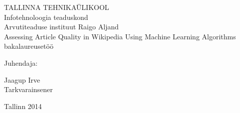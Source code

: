 \begin{titlepage}
\begin{center}
{\large TALLINNA TEHNIKAÜLIKOOL \\
Infotehnoloogia teaduskond \\
Arvutiteaduse instituut}
\vfill
{\large Raigo Aljand} \\
\vspace{7mm}
{\LARGE Assessing Article Quality in Wikipedia Using Machine Learning
Algorithms} \\
\vspace{7mm}
bakalaureusetöö
\vspace{20mm}
\begin{flushright}
Juhendaja:
\begin{minipage}{35mm}
{\large
Jaagup Irve \\
Tarkvarainsener}
\end{minipage}
\end{flushright}
\vfill
Tallinn 2014
\end{center}
\end{titlepage}
